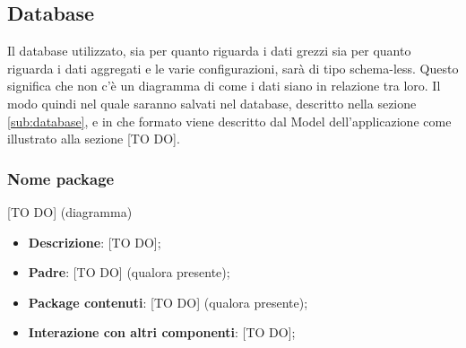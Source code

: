 %


\subsection{Database} %
\label{sec:database}
Il database utilizzato, sia per quanto riguarda i dati grezzi sia per quanto riguarda i dati aggregati e le varie configurazioni, sarà di tipo schema-less. Questo significa che non c'è un diagramma di come i dati siano in relazione tra loro. \newline
Il modo quindi nel quale saranno salvati nel database, descritto nella sezione \ref{sub:database}, e in che formato viene descritto dal Model dell'applicazione come illustrato alla sezione [TO DO]. \newline

  \subsubsection{Nome package} %
  \label{ssub:nome_del_package}
  [TO DO] (diagramma) \newline \newline

  \begin{itemize}
    \item \textbf{Descrizione}: [TO DO];
    \item \textbf{Padre}: [TO DO] (qualora presente);
    \item \textbf{Package contenuti}: [TO DO] (qualora presente);
    \item \textbf{Interazione con altri componenti}: [TO DO];
  \end{itemize}

